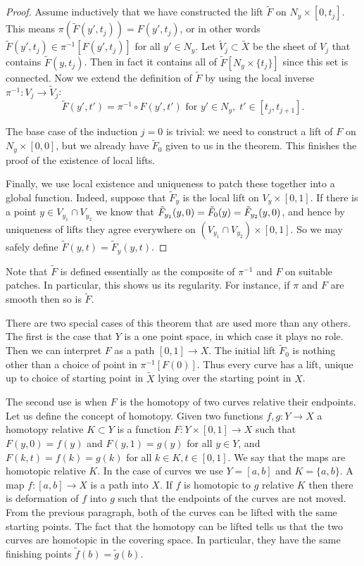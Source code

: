 \begin{proof}
Assume inductively that we have constructed the lift $\tilde{F}$ on $N_y \times [0,t_j]$.
This means $\pi(\tilde{F}(y',t_j)) = F(y',t_j)$, or in other words $\tilde{F}(y',t_j) \in \pi^{-1}[F(y',t_j)]$ for all $y' \in N_{y}$.
Let $\tilde{V}_j \subset \tilde{X}$ be the sheet of $V_j$ that contains $\tilde{F}(y,t_j)$.
Then in fact it contains all of $\tilde{F}[N_{y}\times\{t_j\}]$ since this set is connected.
Now we extend the definition of $\tilde{F}$ by using the local inverse $\pi^{-1} : V_j \to \tilde{V}_j$:
\[
\tilde{F}(y', t') = \pi^{-1} \circ F(y',t') \text{ for } y' \in N_y,\; t' \in [t_j,t_{j+1}].
\]

The base case of the induction $j=0$ is trivial: we need to construct a lift of $F$ on $N_y\times[0,0]$, but we already have $\tilde{F}_0$ given to us in the theorem.
This finishes the proof of the existence of local lifts.

Finally, we use local existence and uniqueness to patch these together into a global function.
Indeed, suppose that $\tilde{F}_y$ is the local lift on $V_{y}\times[0,1]$.
If there is a point $y \in V_{y_1}\cap V_{y_2}$ we know that $\Tilde{F}_{y_1}(y,0) = \Tilde{F}_0(y) = \Tilde{F}_{y_2}(y,0)$, and hence by uniqueness of lifts they agree everywhere on $(V_{y_1}\cap V_{y_2})\times[0,1]$.
So we may safely define $\tilde{F}(y,t) = \tilde{F}_y(y,t)$.
\end{proof}

Note that $\tilde{F}$ is defined essentially as the composite of $\pi^{-1}$ and $F$ on suitable patches.
In particular, this shows us its regularity.
For instance, if $\pi$ and $F$ are smooth then so is $\tilde{F}$.

There are two special cases of this theorem that are used more than any others.
The first is the case that $Y$ is a one point space, in which case it plays no role.
Then we can interpret $F$ as a path $[0,1] \to X$.
The initial lift $\tilde{F}_0$ is nothing other than a choice of point in $\pi^{-1}[F(0)]$.
Thus every curve has a lift, unique up to choice of starting point in $\tilde{X}$ lying over the starting point in $X$.

The second use is when $F$ is the homotopy of two curves relative their endpoints.
Let us define the concept of homotopy.
Given two functions $f,g : Y \to X$ a homotopy relative $K \subset Y$ is a function $F : Y \times [0,1] \to X$ such that $F(y,0) = f(y)$ and $F(y,1) = g(y)$ for all $y \in Y$, and $F(k,t) = f(k) = g(k)$ for all $k\in K, t\in[0,1]$.
We say that the maps are homotopic relative $K$.
In the case of curves we use $Y = [a,b]$ and $K = \{a,b\}$.
A map $f : [a,b] \to X$ is a path into $X$.
If $f$ is homotopic to $g$ relative $K$ then there is deformation of $f$ into $g$ such that the endpoints of the curves are not moved.
From the previous paragraph, both of the curves can be lifted with the same starting points.
The fact that the homotopy can be lifted tells us that the two curves are homotopic in the covering space.
In particular, they have the same finishing points $\tilde{f}(b) = \tilde{g}(b)$. 

